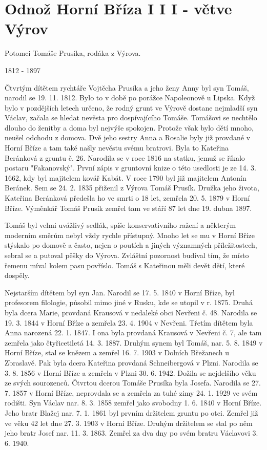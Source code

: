 \documentclass[../dejiny-rodu-prusiku.tex]{subfiles}
\begin{document}
\section{Odnož Horní Bříza I I I - větve Výrov}

Potomci Tomáše Prusíka, rodáka z Výrova.

1812 - 1897

Čtvrtým dítětem rychtáře Vojtěcha Prusíka a jeho ženy Anny byl syn Tomáš, narodil se 19. 11. 1812. Bylo to v době po porážce Napoleonově u Lipska. Když bylo v pozdějších letech určeno, že rodný grunt ve Výrově dosta­ne nejmladší syn Václav, začala se hledat nevěsta pro dospívajícího Tomáše. Tomášovi se nechtělo dlouho do ženitby a doma byl nejvýše spokojen. Protože však bylo dětí mnoho, neušel odchodu z domova. Dvě jeho sestry Anna a Rosalie byly již provdané v Horní Bříze a tam také našly nevěstu svému bratrovi. Byla to Kateřina Beránková z gruntu č. 26. Narodila se v roce 1816 na statku, jemuž se říkalo postaru "Fakanovský". První zápis v gruntovní knize o této usedlosti je ze 14. 3. 1662, kdy byl majitelem kovář Kabát. V roce 1790 byl již majitelem Antonín Beránek. Sem se 24. 2. 1835 přiženil z Výrova Tomáš Prusík. Družka jeho života, Kateřina Beránková předešla ho ve smrti o 18 let, zemřela 20. 5. 1879 v Horní Bříze. Výměnkář Tomáš Prusík zemřel tam ve stáří 87 let dne 19. dubna 1897.

Tomáš byl velmi uvážlivý sedlák, spíše konservativního ražení a některým moderním směrům nebyl vždy rychle přístupný. Mnoho let se mu v Horní Bříze stýskalo po domově a často, nejen o poutích a jiných významných příležitostech, sebral se a putoval pěšky do Výrova. Zvláštní pozornost budíval tím, že místo řemenu míval kolem pasu povříslo. Tomáš s Kateřinou měli devět dětí, které dospěly.

Nejstarším dítětem byl syn Jan. Narodil se 17. 5. 1840 v Horní Bříze, byl profesorem filologie, působil mimo jiné v Rusku, kde se utopil v r. 1875. Druhá byla dcera Marie, provdaná Krausová v nedaleké obci Nevřeni č. 48. Narodila se 19. 3. 1844 v Horní Bříze a zemřela 23. 4. 1904 v Nevřeni. Třetím dítětem byla Anna narozená 22. 1. 1847. I ona byla provdaná Krausová v Nevře­ni č. 7, ale tam zemřela jako čtyřicetiletá 14. 3. 1887. Druhým synem byl Tomáš, nar. 5. 8. 1849 v Horní Bříze, stal se knězem a zemřel 16. 7. 1903 v Dolních Břežanech u Zbraslavě. Pak byla dcera Kateřina provdaná Schneibergová v Plzni. Narodila se 3. 8. 1856 v Horní Bříze a zemřela v Plzni 30. 6. 1942. Dožila se nejdelšího věku ze svých sourozenců. Čtvrtou dcerou Tomáše Prusíka byla Josefa. Narodila se 27. 7. 1857 v Horní Bříze, neprovdala se a zemřela za tuhé zimy 24. 1. 1929 ve svém rodišti. Syn Václav nar. 8. 3. 1858 zemřel jako svobodny 1. 6. 1840 v Horní Bříze. Jeho bratr Blažej nar. 7. 1. 1861 byl prvním držitelem gruntu po otci. Zemřel již ve věku 42 let dne 27. 3. 1903 v Horní Bříze. Druhým držitelem se stal po něm jeho bratr Josef nar. 11. 3. 1863. Zemřel za dva dny po svém bratru Václavovi 3. 6. 1940.
\end{document}
